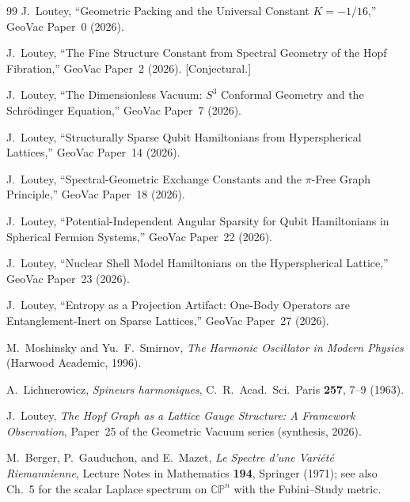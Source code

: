 \documentclass[twocolumn,pra,amsmath,amssymb,superscriptaddress]{revtex4-2}
\begin{document}
\begin{thebibliography}{99}
J.~Loutey,
``Geometric Packing and the Universal Constant $K = -1/16$,''
GeoVac Paper~0 (2026).

J.~Loutey,
``The Fine Structure Constant from Spectral Geometry of the Hopf
Fibration,''
GeoVac Paper~2 (2026). [Conjectural.]

J.~Loutey,
``The Dimensionless Vacuum: $S^3$ Conformal Geometry and the
Schr\"odinger Equation,''
GeoVac Paper~7 (2026).

J.~Loutey,
``Structurally Sparse Qubit Hamiltonians from Hyperspherical
Lattices,''
GeoVac Paper~14 (2026).

J.~Loutey,
``Spectral-Geometric Exchange Constants and the $\pi$-Free Graph
Principle,''
GeoVac Paper~18 (2026).

J.~Loutey,
``Potential-Independent Angular Sparsity for Qubit Hamiltonians in
Spherical Fermion Systems,''
GeoVac Paper~22 (2026).

J.~Loutey,
``Nuclear Shell Model Hamiltonians on the Hyperspherical Lattice,''
GeoVac Paper~23 (2026).

J.~Loutey,
``Entropy as a Projection Artifact: One-Body Operators are
Entanglement-Inert on Sparse Lattices,''
GeoVac Paper~27 (2026).

M.~Moshinsky and Yu.~F.~Smirnov,
\emph{The Harmonic Oscillator in Modern Physics}
(Harwood Academic, 1996).

A.~Lichnerowicz,
\textit{Spineurs harmoniques},
C.~R.\ Acad.\ Sci.\ Paris \textbf{257}, 7--9 (1963).

J.~Loutey,
\textit{The Hopf Graph as a Lattice Gauge Structure: A Framework
Observation}, Paper~25 of the Geometric Vacuum series
(synthesis, 2026).

M.~Berger, P.~Gauduchon, and E.~Mazet,
\textit{Le Spectre d'une Vari\'et\'e Riemannienne},
Lecture Notes in Mathematics \textbf{194}, Springer (1971);
see also Ch.~5 for the scalar Laplace spectrum on
$\mathbb{CP}^n$ with the Fubini--Study metric.

\end{thebibliography}
\end{document}
